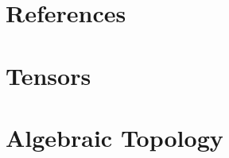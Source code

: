 \documentclass[
]{book}
\begin{document}
\hypertarget{references}{%
\chapter*{References}\label{references}}

\hypertarget{appendix-appendix}{%
\appendix}


\hypertarget{tensors}{%
\chapter{Tensors}\label{tensors}}

\hypertarget{algebraic-topology}{%
\chapter{Algebraic Topology}\label{algebraic-topology}}

  
\end{document}
